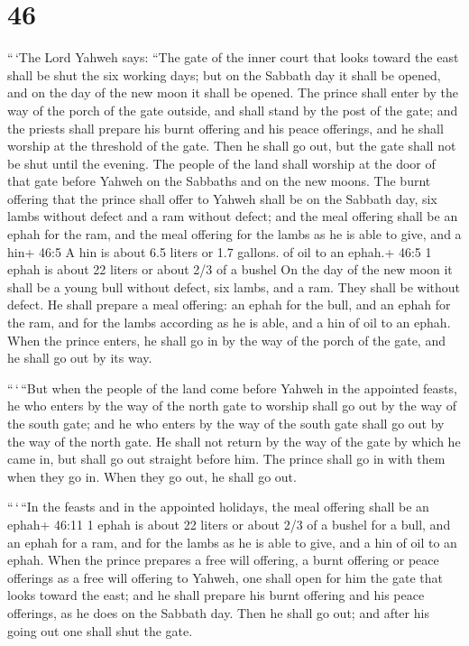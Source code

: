 \hypertarget{section-44}{%
\section{46}\label{section-44}}

 ``\,`The Lord Yahweh says: ``The gate of the inner court
that looks toward the east shall be shut the six working days; but on
the Sabbath day it shall be opened, and on the day of the new moon it
shall be opened.  The prince shall enter by the way of the
porch of the gate outside, and shall stand by the post of the gate; and
the priests shall prepare his burnt offering and his peace offerings,
and he shall worship at the threshold of the gate. Then he shall go out,
but the gate shall not be shut until the evening.  The
people of the land shall worship at the door of that gate before Yahweh
on the Sabbaths and on the new moons.  The burnt offering
that the prince shall offer to Yahweh shall be on the Sabbath day, six
lambs without defect and a ram without defect;  and the meal
offering shall be an ephah for the ram, and the meal offering for the
lambs as he is able to give, and a hin+ 46:5 A hin is about 6.5 liters
or 1.7 gallons. of oil to an ephah.+ 46:5 1 ephah is about 22 liters or
about 2/3 of a bushel  On the day of the new moon it shall
be a young bull without defect, six lambs, and a ram. They shall be
without defect.  He shall prepare a meal offering: an ephah
for the bull, and an ephah for the ram, and for the lambs according as
he is able, and a hin of oil to an ephah.  When the prince
enters, he shall go in by the way of the porch of the gate, and he shall
go out by its way.

 ``\,`\,``But when the people of the land come before Yahweh
in the appointed feasts, he who enters by the way of the north gate to
worship shall go out by the way of the south gate; and he who enters by
the way of the south gate shall go out by the way of the north gate. He
shall not return by the way of the gate by which he came in, but shall
go out straight before him.  The prince shall go in with
them when they go in. When they go out, he shall go out.

 ``\,`\,``In the feasts and in the appointed holidays, the
meal offering shall be an ephah+ 46:11 1 ephah is about 22 liters or
about 2/3 of a bushel for a bull, and an ephah for a ram, and for the
lambs as he is able to give, and a hin of oil to an ephah. 
When the prince prepares a free will offering, a burnt offering or peace
offerings as a free will offering to Yahweh, one shall open for him the
gate that looks toward the east; and he shall prepare his burnt offering
and his peace offerings, as he does on the Sabbath day. Then he shall go
out; and after his going out one shall shut the gate.

